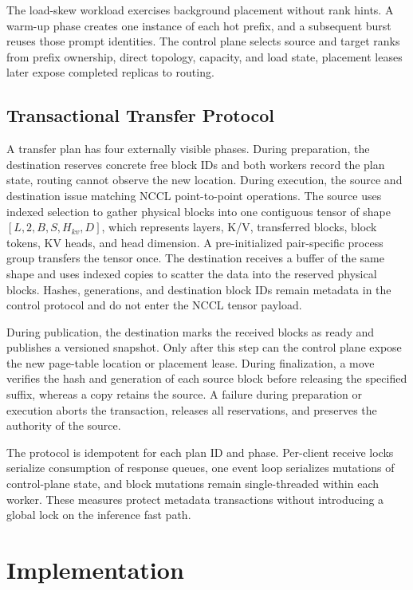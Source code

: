 \documentclass{article}
\begin{document}
The load-skew workload exercises background placement without rank hints. A warm-up phase creates one instance of each hot prefix, and a subsequent burst reuses those prompt identities. The control plane selects source and target ranks from prefix ownership, direct topology, capacity, and load state, placement leases later expose completed replicas to routing.

\subsection{Transactional Transfer Protocol}

A transfer plan has four externally visible phases. During preparation, the destination reserves concrete free block IDs and both workers record the plan state, routing cannot observe the new location. During execution, the source and destination issue matching NCCL point-to-point operations. The source uses indexed selection to gather physical blocks into one contiguous tensor of shape $[L,2,B,S,H_{kv},D]$, which represents layers, K/V, transferred blocks, block tokens, KV heads, and head dimension. A pre-initialized pair-specific process group transfers the tensor once. The destination receives a buffer of the same shape and uses indexed copies to scatter the data into the reserved physical blocks. Hashes, generations, and destination block IDs remain metadata in the control protocol and do not enter the NCCL tensor payload.

During publication, the destination marks the received blocks as ready and publishes a versioned snapshot. Only after this step can the control plane expose the new page-table location or placement lease. During finalization, a move verifies the hash and generation of each source block before releasing the specified suffix, whereas a copy retains the source. A failure during preparation or execution aborts the transaction, releases all reservations, and preserves the authority of the source.

The protocol is idempotent for each plan ID and phase. Per-client receive locks serialize consumption of response queues, one event loop serializes mutations of control-plane state, and block mutations remain single-threaded within each worker. These measures protect metadata transactions without introducing a global lock on the inference fast path.

\section{Implementation}
\label{sec:impl}
\end{document}
